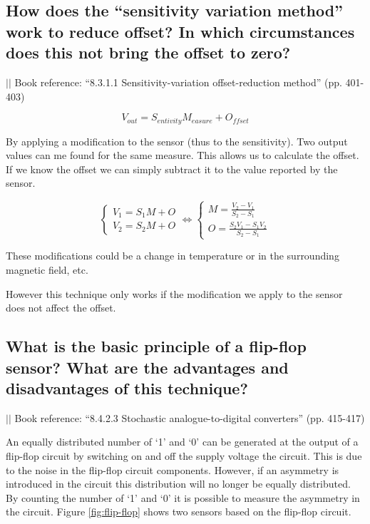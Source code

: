 \documentclass[10pt,a4paper]{article}
\newcommand{\bookref}[2]{\indent\indent\indent\indent $\vert\vert$ Book reference: ``#1'' (pp. #2) \newline}
\begin{document}
\subsection{How does the ``sensitivity variation method'' work to reduce offset? In which circumstances does this not bring the offset to zero?}

\bookref{8.3.1.1 Sensitivity-variation offset-reduction method}{401-403}

\[ V_{out} = S_{entivity}M_{easure} + O_{ffset} \]

By applying a modification to the sensor (thus to the sensitivity). Two output values can me found for the same measure. This allows us to calculate the offset. If we know the offset we can simply subtract it to the value reported by the sensor.

\[
\begin{cases} V_1 = S_1M + O  \\ V_2 = S_2M+O \end{cases} \iff
\begin{cases} M = \frac{V_2-V_1}{S_2-S_1}  \\ O = \frac{S_2 V_1 - S_1 V_2}{S_2 - S_1} \end{cases} 
\]

These modifications could be a change in temperature or in the surrounding magnetic field, etc.

However this technique only works if the modification we apply to the sensor does not affect the offset.

\subsection{What is the basic principle of a flip-flop sensor? What are the advantages and disadvantages of this technique?}

\bookref{8.4.2.3 Stochastic analogue-to-digital converters}{415-417}

An equally distributed number of `1' and `0' can be generated at the output of a flip-flop circuit by switching on and off the supply voltage the circuit. This is due to the noise in the  flip-flop circuit components. However, if an asymmetry is introduced in the circuit this distribution will no longer be equally distributed. By counting the number of `1' and `0' it is possible to measure the asymmetry in the circuit. Figure \ref{fig:flip-flop} shows two sensors based on the flip-flop circuit.
\end{document}
